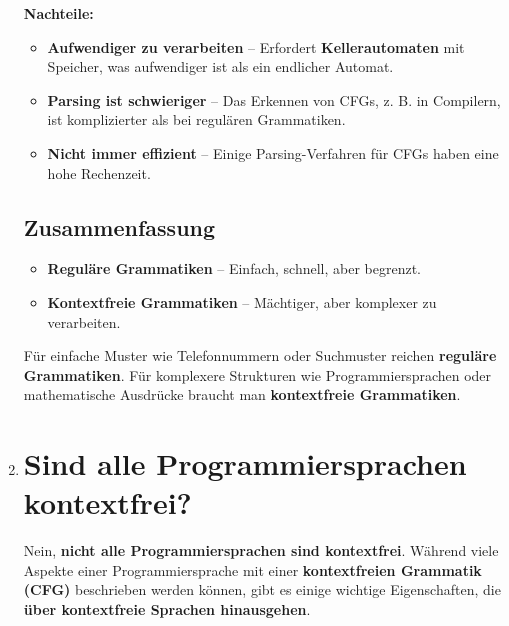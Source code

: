 \documentclass[a4paper,12pt]{article}
\begin{document}
\begin{enumerate}
	\textbf{Nachteile:}
	\begin{itemize}
		\item \textbf{Aufwendiger zu verarbeiten} – Erfordert \textbf{Kellerautomaten} mit Speicher, was aufwendiger ist als ein endlicher Automat.
		\item \textbf{Parsing ist schwieriger} – Das Erkennen von CFGs, z. B. in Compilern, ist komplizierter als bei regulären Grammatiken.
		\item \textbf{Nicht immer effizient} – Einige Parsing-Verfahren für CFGs haben eine hohe Rechenzeit.
	\end{itemize}
	
	\subsection*{Zusammenfassung}
	\begin{itemize}
		\item \textbf{Reguläre Grammatiken} – Einfach, schnell, aber begrenzt.
		\item \textbf{Kontextfreie Grammatiken} – Mächtiger, aber komplexer zu verarbeiten.
	\end{itemize}
	
	Für einfache Muster wie Telefonnummern oder Suchmuster reichen \textbf{reguläre Grammatiken}. Für komplexere Strukturen wie Programmiersprachen oder mathematische Ausdrücke braucht man \textbf{kontextfreie Grammatiken}.
	\item \section*{Sind alle Programmiersprachen kontextfrei?}
	
	Nein, \textbf{nicht alle Programmiersprachen sind kontextfrei}. Während viele Aspekte einer Programmiersprache mit einer \textbf{kontextfreien Grammatik (CFG)} beschrieben werden können, gibt es einige wichtige Eigenschaften, die \textbf{über kontextfreie Sprachen hinausgehen}.
	
	
	
	
	\end{enumerate}	
\end{document}
